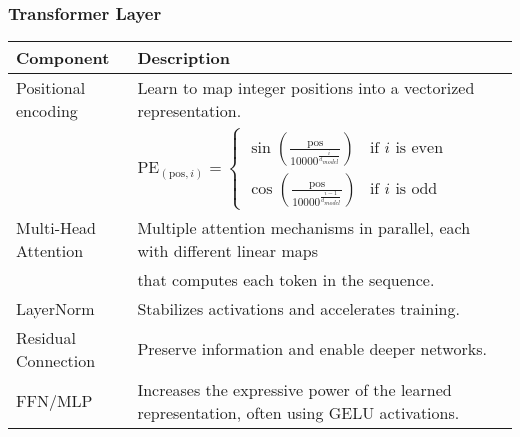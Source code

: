 \subsubsection{Transformer Layer}
\begin{summary}
    \vspace{-1em}
    \begin{center}
        \begin{tabular}{ll}
            \toprule
            \textbf{Component} & \textbf{Description} \\
            \midrule
            Positional encoding & Learn to map integer positions into a vectorized representation. \\
            & $\text{PE}_{(\text{pos},i)} = 
            \begin{cases}
                \sin\left(\frac{\text{pos}}{10000^{\frac{i}{d_{model}}}}\right) & \text{if } i \text{ is even} \\
                \cos\left(\frac{\text{pos}}{10000^{\frac{i-1}{d_{model}}}}\right) & \text{if } i \text{ is odd}
            \end{cases}$ \\
            \midrule
            Multi-Head Attention & Multiple attention mechanisms in parallel, each with different linear maps \\ 
            & that computes each token in the sequence. \\
            \midrule
            LayerNorm & Stabilizes activations and accelerates training. \\
            \midrule
            Residual Connection & Preserve information and enable deeper networks. \\
            \midrule
            FFN/MLP & Increases the expressive power of the learned representation, often using GELU activations. \\
            \bottomrule
        \end{tabular}
    \end{center}
\end{summary}

